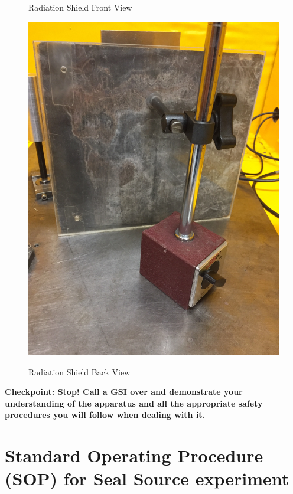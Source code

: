 \documentclass{../lab}
\begin{document}
\begin{figure}[!h]
\begin{minipage}{.49\linewidth}
    \caption{Radiation Shield Front View}
\end{minipage}\hfill
\begin{minipage}{.49\linewidth}
    \centering
    \href{http://experimentationlab.berkeley.edu/sites/default/files/Shield-Back.JPG}{\includegraphics[width=\linewidth,keepaspectratio]{images/Shield-Back.JPG}} \\
    \caption{Radiation Shield Back View}
\end{minipage} 
\end{figure}

\textbf{Checkpoint: Stop! Call a GSI over and demonstrate your understanding of the apparatus and all the appropriate safety procedures you will follow when dealing with it.}

\section{Standard Operating Procedure (SOP) for Seal Source experiment}
\end{document}
